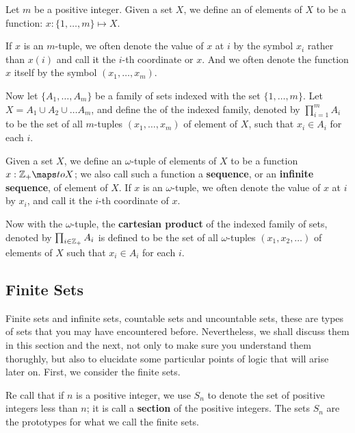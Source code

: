 \begin{definition}[$m$-tuple]
Let $m$ be a positive integer. Given a set $X$, we define an \textbf{} of elements of $X$ to be a function: $x: \{1, \dots, m\} \mapsto X$.
\end{definition}

If $x$ is an $m$-tuple, we often denote the value of $x$ at $i$ by the symbol $x_i$ rather than $x(i)$ and call it the $i$-th coordinate or $x$. And we often denote the function $x$ itself by the symbol $(x_1, \dots, x_m)$.

Now let $\{A_1, \dots, A_m\}$ be a family of sets indexed with the set $\{1, \dots, m\}$. Let $X = A_1 \cup A_2 \cup \dots A_m$, and define the \textbf{} of the indexed family, denoted by $\prod_{i = 1}^{m} A_i$ to be the set of all $m$-tuples $(x_1, \dots, x_m)$ of element of $X$, such that $x_i \in A_i$ for each $i$.

\begin{definition}
Given a set $X$, we define an $\omega$-tuple of elements of $X$ to be a function $x: \Z_{+} \maps to X$; we also call such a function a \textbf{sequence}, or an \textbf{infinite sequence}, of element of $X$. If $x$ is an $\omega$-tuple, we often denote the value of $x$ at $i$ by $x_i$, and call it the $i$-th coordinate of $x$. 
\end{definition}

Now with the $\omega$-tuple, the \textbf{cartesian product} of the indexed family of sets, denoted by $\prod_{i \in \mathbb{Z}_+} A_i$ is defined to be the set of all $\omega$-tuples $(x_1, x_2, \dots)$ of elements of $X$ such that $x_i \in A_i$ for each $i$.

\subsection{Finite Sets}

Finite sets and infinite sets, countable sets and uncountable sets, these are types of sets that you may have encountered before. Nevertheless, we shall discuss them in this section and the next, not only to make sure you understand them thorughly, but also to elucidate some particular points of logic that will arise later on. First, we consider the finite sets.

Re call that if $n$ is a positive integer, we use $S_n$ to denote the set of positive integers less than $n$; it is call a \textbf{section} of the positive integers. The sets $S_n$ are the prototypes for what we call the finite sets.

